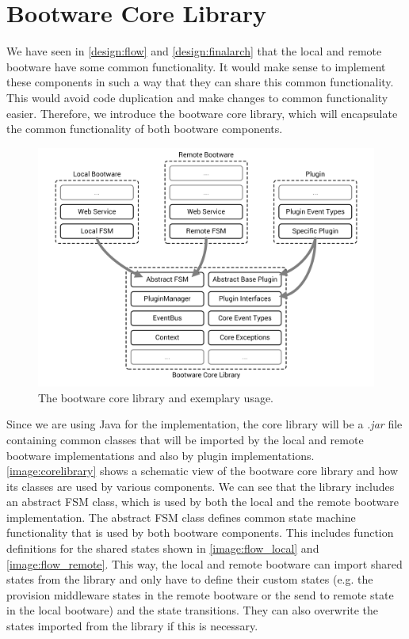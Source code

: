 \section{Bootware Core Library}

We have seen in \autoref{design:flow} and \autoref{design:finalarch} that the local and remote bootware have some common functionality.
It would make sense to implement these components in such a way that they can share this common functionality.
This would avoid code duplication and make changes to common functionality easier.
Therefore, we introduce the bootware core library, which will encapsulate the common functionality of both bootware components.

\begin{figure}[!htbp]
	\centering
	\includegraphics[resolution=600]{implementation/assets/core_library}
	\caption{The bootware core library and exemplary usage.}
	\label{image:corelibrary}
\end{figure}

Since we are using Java for the implementation, the core library will be a \textit{.jar} file containing common classes that will be imported by the local and remote bootware implementations and also by plugin implementations.
\autoref{image:corelibrary} shows a schematic view of the bootware core library and how its classes are used by various components.
We can see that the library includes an abstract FSM class, which is used by both the local and the remote bootware implementation.
The abstract FSM class defines common state machine functionality that is used by both bootware components.
This includes function definitions for the shared states shown in \autoref{image:flow_local} and \autoref{image:flow_remote}.
This way, the local and remote bootware can import shared states from the library and only have to define their custom states (e.g. the provision middleware states in the remote bootware or the send to remote state in the local bootware) and the state transitions.
They can also overwrite the states imported from the library if this is necessary.

